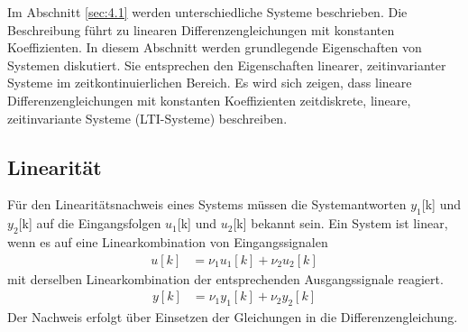 Im Abschnitt \ref{sec:4.1} werden unterschiedliche Systeme beschrieben. Die Beschreibung führt zu linearen Differenzengleichungen mit konstanten Koeffizienten. In diesem Abschnitt werden grundlegende Eigenschaften von Systemen diskutiert. Sie entsprechen den Eigenschaften linearer, zeitinvarianter Systeme im zeitkontinuierlichen Bereich. Es wird sich zeigen, dass lineare Differenzengleichungen mit konstanten Koeffizienten zeitdiskrete, lineare, zeitinvariante Systeme (LTI-Systeme) beschreiben.

\subsection{Linearität}\label{sec:linearituxe4t}

Für den Linearitätsnachweis eines Systems müssen die Systemantworten \(y_{1}\){[}k{]} und \(y_{2}\){[}k{]} auf die Eingangsfolgen \(u_{1}\){[}k{]} und \(u_{2}\){[}k{]} bekannt sein. Ein System ist linear, wenn es auf eine Linearkombination von Eingangssignalen
\begin{align}
u[ k] &= \nu_{1}  u_{1}[ k] + \nu_{2}  u_{2}[ k] \label{eq:4.20}
\end{align}
mit derselben Linearkombination der entsprechenden Ausgangssignale reagiert.
\begin{align}
y[ k] &= \nu_{1}  y_{1}[ k] + \nu_{2}  y_{2}[ k] \label{eq:4.21}
\end{align}
Der Nachweis erfolgt über Einsetzen der Gleichungen in die Differenzengleichung.

